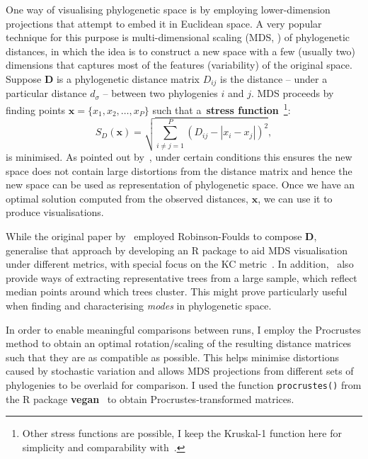 One way of visualising phylogenetic space is by employing lower-dimension projections that attempt to embed it in Euclidean space.
A very popular technique for this purpose is multi-dimensional scaling (MDS, \cite{Hillis2005}) of phylogenetic distances, in which the idea is to construct a new space with a few (usually two) dimensions that captures most of the features (variability) of the original space.
Suppose $\boldsymbol D$ is a phylogenetic distance matrix $D_{ij}$ is the distance -- under a particular distance $d_\sigma$ -- between two  phylogenies $i$ and $j$.
MDS proceeds by finding points $\boldsymbol x = \{x_1, x_2, \ldots, x_P\}$ such that a~\textbf{stress function}~\citep{Kruskal1964}\footnote{Other stress functions are possible, I keep the Kruskal-1 function here for simplicity and comparability with~\cite{Hillis2005}.}:
\begin{equation}
 \label{eq:stressF}
 S_D(\boldsymbol x) =  \sqrt{ \sum_{i \neq j = 1}^P \left( D_{ij} - |x_i - x_j|\right)^2},
\end{equation}
is minimised.
As pointed out by~\cite{Hillis2005}, under certain conditions this ensures the new space does not contain large distortions from the distance matrix and hence the new space can be used as representation of phylogenetic space.
Once we have an optimal solution computed from the observed distances, $\boldsymbol x$, we can use it to produce visualisations.

While the original paper by~\cite{Hillis2005} employed Robinson-Foulds to compose $\boldsymbol D$,~\cite{Jombart2017} generalise that approach by developing an R package to aid MDS visualisation under different metrics, with special focus on the KC metric~\citep{Kendall2016}.
In addition,~\cite{Jombart2017} also provide ways of extracting representative trees from a large sample, which reflect median points around which trees cluster.
This might prove particularly useful when finding and characterising \textit{modes} in phylogenetic space.

In order to enable meaningful comparisons between runs, I employ the Procrustes method to obtain an optimal rotation/scaling of the resulting distance matrices such that they are as compatible as possible. 
This helps minimise distortions caused by stochastic variation and allows MDS projections from different sets of phylogenies to be overlaid for comparison.
I used the function \verb|procrustes()| from the R package \textbf{vegan}~\citep{Oksanen2018} to obtain Procrustes-transformed matrices.

